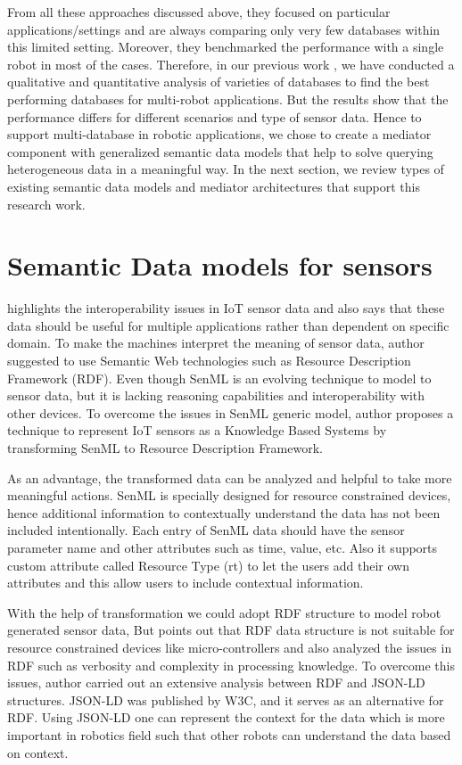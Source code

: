 		From all these approaches discussed above, they focused on particular applications/settings and are always comparing only very few databases within this limited setting. Moreover, they benchmarked the performance with a single robot in most of the cases. Therefore, in our previous work \cite{ravichandranworkbench}, we have conducted a qualitative and quantitative analysis of varieties of databases to find the best performing databases for multi-robot applications. But the results show that the performance differs for different scenarios and type of sensor data. Hence to support multi-database in robotic applications, we chose to create a mediator component with generalized semantic data models that help to solve querying heterogeneous data in a meaningful way. In the next section, we review types of existing semantic data models and mediator architectures that support this research work.
		
	\section{Semantic Data models for sensors}
	\citet{su2014connecting} highlights the interoperability issues in IoT sensor data and also says that these data should be useful for multiple applications rather than dependent on specific domain. To make the machines interpret the meaning of sensor data, author suggested to use Semantic Web technologies such as Resource Description Framework (RDF). Even though SenML is an evolving technique to model to sensor data, but it is lacking reasoning capabilities and interoperability with other devices. To overcome the issues in SenML generic model, author proposes a technique to represent IoT sensors as a Knowledge Based Systems by transforming SenML to Resource Description Framework. 
	
	As an advantage, the transformed data can be analyzed and helpful to take more meaningful actions. 
	SenML is specially designed for resource constrained devices, hence additional information to contextually understand the data has not been included intentionally. Each entry of SenML data should have the sensor parameter name and other attributes such as time, value, etc. Also it supports custom attribute called Resource Type (rt) to let the users add their own attributes and this allow users to include contextual information.
	
	With the help of transformation we could adopt RDF structure to model robot generated sensor data, But \citet{charpenay2018towards} points out that RDF data structure is not suitable for resource constrained devices like micro-controllers and also analyzed the issues in RDF such as verbosity and complexity in processing knowledge. To overcome this issues, author carried out an extensive analysis between RDF and JSON-LD structures. JSON-LD was published by W3C, and it serves as an alternative for RDF. Using JSON-LD one can represent the context for the data which is more important in robotics field such that other robots can understand the data based on context.
	
